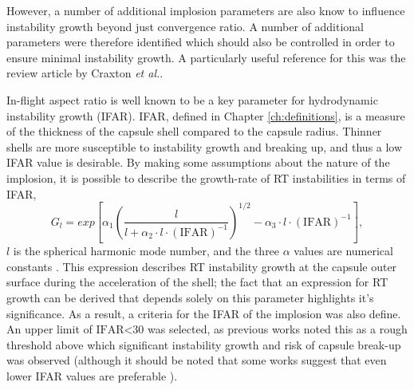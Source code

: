 
However, a number of additional implosion parameters are also know to influence instability growth beyond just convergence ratio. A number of additional parameters were therefore identified which should also be controlled in order to ensure minimal instability growth. A particularly useful reference for this was the review article by Craxton \textit{et al.}\cite{Craxton2015}.

In-flight aspect ratio is well known to be a key parameter for hydrodynamic instability growth (IFAR). IFAR, defined in Chapter \ref{ch:definitions}, is a measure of the thickness of the capsule shell compared to the capsule radius. Thinner shells are more susceptible to instability growth and breaking up, and thus a low IFAR value is desirable. By making some assumptions about the nature of the implosion, it is possible to describe the growth-rate of RT instabilities in terms of IFAR, 
\begin{equation} G_l = exp \left[ \alpha_1 \left( \frac{l}{l + \alpha_2 \cdot l \cdot (\mathrm{IFAR})^{-1}} \right)^{1/2} - \alpha_3 \cdot l \cdot (\mathrm{IFAR})^{-1} \right], \label{eq: IFARGrowth} \end{equation} $l$ is the spherical harmonic mode number, and the three $\alpha$ values are numerical constants \cite{Atzeni2008}. This expression describes RT instability growth at the capsule outer surface during the acceleration of the shell; the fact that an expression for RT growth can be derived that depends solely on this parameter highlights it's significance. As a result, a criteria for the IFAR of the implosion was also define. An upper limit of $\textrm{IFAR<30}$ was selected, as previous works noted this as a rough threshold above which significant instability growth and risk of capsule break-up was observed \cite{Lindl1995} (although it should be noted that some works suggest that even lower IFAR values are preferable \cite{Radha2011, Goncharov2003}).

